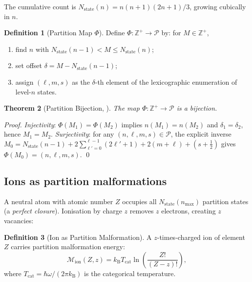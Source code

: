 \documentclass[twocolumn,10pt,a4paper]{article}
\theoremstyle{thmstyle}
\newtheorem{theorem}{Theorem}[section]
\theoremstyle{definition}
\newtheorem{definition}[theorem]{Definition}
\theoremstyle{remark}
\newcommand{\Zp}{\mathbb{Z}^{+}}
\newcommand{\kB}{k_{\mathrm{B}}}
\newcommand{\Parts}{\mathcal{P}}
\newcommand{\PhiMap}{\varPhi}
\newcommand{\Mop}{\mathcal{M}}
\newcommand{\Mcyc}{M}
\newcommand{\Tcat}{T_{\mathrm{cat}}}
\begin{document}
The cumulative count is $N_\text{state}(n) = n(n+1)(2n+1)/3$, growing
cubically in $n$.

\begin{definition}[Partition Map $\PhiMap$]
\label{def:phi}
Define $\PhiMap: \Zp \to \Parts$ by: for $\Mcyc \in \Zp$,
\begin{enumerate}[nosep,label=(\roman*)]
\item find $n$ with $N_\text{state}(n{-}1) < \Mcyc \leq N_\text{state}(n)$;
\item set offset $\delta = \Mcyc - N_\text{state}(n{-}1)$;
\item assign $(\ell, m, s)$ as the $\delta$-th element of the lexicographic
  enumeration of level-$n$ states.
\end{enumerate}
\end{definition}

\begin{theorem}[Partition Bijection, \citealp{cantor1874,dedekind1888}]
\label{thm:bijection}
The map $\PhiMap: \Zp \to \Parts$ is a bijection.
\end{theorem}

\begin{proof}
\textit{Injectivity}: $\PhiMap(\Mcyc_1) = \PhiMap(\Mcyc_2)$ implies
$n(\Mcyc_1) = n(\Mcyc_2)$ and $\delta_1 = \delta_2$, hence $\Mcyc_1 = \Mcyc_2$.
\textit{Surjectivity}: for any $(n,\ell,m,s) \in \Parts$, the explicit
inverse $\Mcyc_0 = N_\text{state}(n{-}1) + 2\sum_{\ell'=0}^{\ell-1}(2\ell'{+}1)
+ 2(m+\ell) + (s+\tfrac{1}{2})$ gives $\PhiMap(\Mcyc_0) = (n,\ell,m,s)$.
\qed
\end{proof}

\subsection{Ions as partition malformations}

A neutral atom with atomic number $Z$ occupies all $N_\text{state}(n_\text{max})$
partition states (a \emph{perfect closure}). Ionisation by charge $z$
removes $z$ electrons, creating $z$ vacancies:

\begin{definition}[Ion as Partition Malformation]
\label{def:malformation}
A $z$-times-charged ion of element $Z$ carries partition malformation
energy:
\begin{equation}
\Mop_\text{ion}(Z,z) = \kB\Tcat\ln\!\left(\frac{Z!}{(Z-z)!}\right),
\label{eq:malformation}
\end{equation}
where $\Tcat = \hbar\omega/(2\pi\kB)$ is the categorical temperature.
\end{definition}
\end{document}
